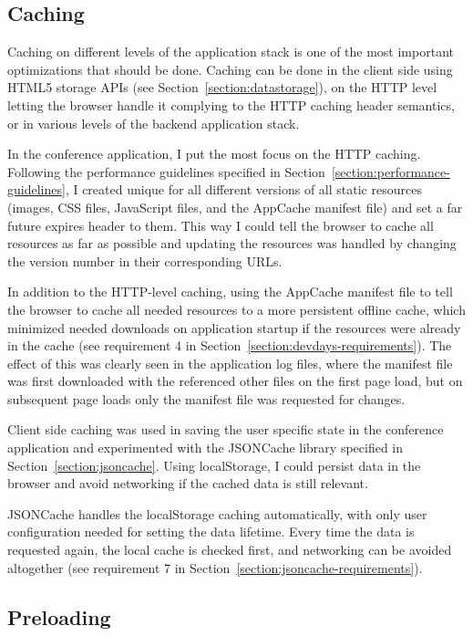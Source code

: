 \subsection{Caching}

Caching on different levels of the application stack is one of the
most important optimizations that should be done. Caching can be done
in the client side using HTML5 storage APIs (see
Section~\ref{section:datastorage}), on the HTTP level letting the
browser handle it complying to the HTTP caching header semantics, or
in various levels of the backend application stack.

In the conference application, I put the most focus on the HTTP
caching. Following the performance guidelines specified in
Section~\ref{section:performance-guidelines}, I created unique
 for all different versions of all static resources
(images, CSS files, JavaScript files, and the AppCache manifest file)
and set a far future expires header to them. This way I could tell the
browser to cache all resources as far as possible and updating the
resources was handled by changing the version number in their
corresponding URLs.

In addition to the HTTP-level caching, using the AppCache manifest
file to tell the browser to cache all needed resources to a more
persistent offline cache, which minimized needed downloads on
application startup if the resources were already in the cache (see
requirement 4 in Section~\ref{section:devdays-requirements}). The
effect of this was clearly seen in the application log files, where
the manifest file was first downloaded with the referenced other files
on the first page load, but on subsequent page loads only the manifest
file was requested for changes.

Client side caching was used in saving the user specific state in the
conference application and experimented with the JSONCache library
specified in Section~\ref{section:jsoncache}. Using localStorage, I
could persist data in the browser and avoid networking if the cached
data is still relevant.

JSONCache handles the localStorage caching automatically, with only
user configuration needed for setting the data lifetime. Every time
the data is requested again, the local cache is checked first, and
networking can be avoided altogether (see requirement 7 in
Section~\ref{section:jsoncache-requirements}).

\subsection{Preloading}

